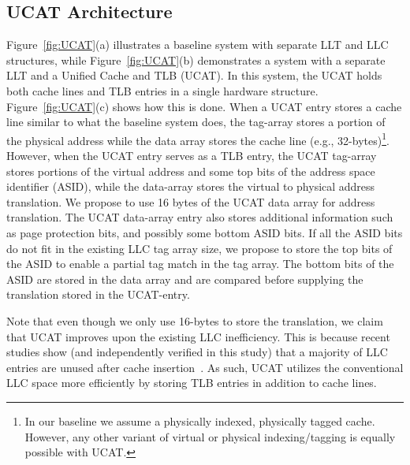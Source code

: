 
\subsection{UCAT Architecture}

\noindent Figure~\ref{fig:UCAT}(a) illustrates a baseline system with
separate LLT and LLC structures, while Figure~\ref{fig:UCAT}(b)
demonstrates a system with a separate LLT and a Unified Cache and TLB (UCAT). In 
this system, the UCAT holds both cache
lines and TLB entries in a single hardware structure.
Figure~\ref{fig:UCAT}(c) shows how this is done. When a UCAT entry
stores a cache line similar to what the baseline system does, the
tag-array stores a portion of the physical address while the data
array stores the cache line (e.g., 32-bytes)\footnote{In our baseline
we assume a physically indexed, physically tagged cache. However, any
other variant of virtual or physical indexing/tagging is equally
possible with UCAT.}. However, when the UCAT entry serves as a TLB
entry, the UCAT tag-array stores portions of the virtual address and
some top bits of the address space identifier (ASID), while the data-array stores the
virtual to physical address translation. We propose to use 16 bytes of
the UCAT data array for address translation. The UCAT data-array entry 
also stores additional information
such as page protection bits, and possibly some bottom ASID bits. If all the ASID
bits do not fit in the existing LLC tag array size, we propose to
store the top bits of the ASID to enable a partial tag match in the
tag array. The bottom bits of the ASID are stored in the data array
and are compared before supplying the translation stored in the
UCAT-entry.

Note that even though we only use 16-bytes to store the translation,
we claim that UCAT improves upon the existing LLC inefficiency. This
is because recent studies show (and independently verified in this
study) that a majority of LLC entries are unused after cache
insertion~\cite{}. As such, UCAT utilizes the conventional LLC space
more efficiently by storing TLB entries in addition to cache lines.

